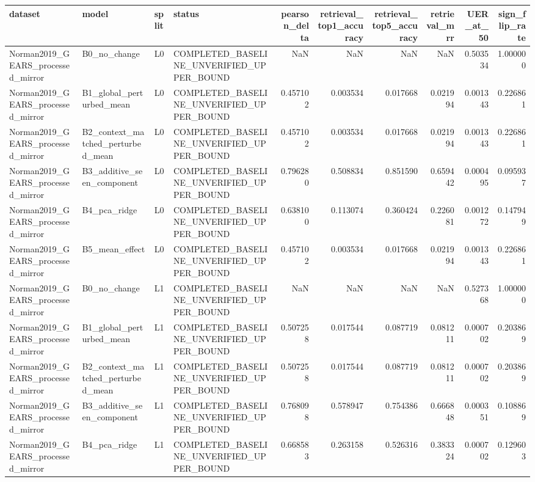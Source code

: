\begin{tabular}{llllrrrrrr}
\toprule
dataset & model & split & status & pearson_delta & retrieval_top1_accuracy & retrieval_top5_accuracy & retrieval_mrr & UER_at_50 & sign_flip_rate \\
\midrule
Norman2019_GEARS_processed_mirror & B0_no_change & L0 & COMPLETED_BASELINE_UNVERIFIED_UPPER_BOUND & NaN & NaN & NaN & NaN & 0.503534 & 1.000000 \\
Norman2019_GEARS_processed_mirror & B1_global_perturbed_mean & L0 & COMPLETED_BASELINE_UNVERIFIED_UPPER_BOUND & 0.457102 & 0.003534 & 0.017668 & 0.021994 & 0.001343 & 0.226861 \\
Norman2019_GEARS_processed_mirror & B2_context_matched_perturbed_mean & L0 & COMPLETED_BASELINE_UNVERIFIED_UPPER_BOUND & 0.457102 & 0.003534 & 0.017668 & 0.021994 & 0.001343 & 0.226861 \\
Norman2019_GEARS_processed_mirror & B3_additive_seen_component & L0 & COMPLETED_BASELINE_UNVERIFIED_UPPER_BOUND & 0.796280 & 0.508834 & 0.851590 & 0.659442 & 0.000495 & 0.095937 \\
Norman2019_GEARS_processed_mirror & B4_pca_ridge & L0 & COMPLETED_BASELINE_UNVERIFIED_UPPER_BOUND & 0.638100 & 0.113074 & 0.360424 & 0.226081 & 0.001272 & 0.147949 \\
Norman2019_GEARS_processed_mirror & B5_mean_effect & L0 & COMPLETED_BASELINE_UNVERIFIED_UPPER_BOUND & 0.457102 & 0.003534 & 0.017668 & 0.021994 & 0.001343 & 0.226861 \\
Norman2019_GEARS_processed_mirror & B0_no_change & L1 & COMPLETED_BASELINE_UNVERIFIED_UPPER_BOUND & NaN & NaN & NaN & NaN & 0.527368 & 1.000000 \\
Norman2019_GEARS_processed_mirror & B1_global_perturbed_mean & L1 & COMPLETED_BASELINE_UNVERIFIED_UPPER_BOUND & 0.507258 & 0.017544 & 0.087719 & 0.081211 & 0.000702 & 0.203869 \\
Norman2019_GEARS_processed_mirror & B2_context_matched_perturbed_mean & L1 & COMPLETED_BASELINE_UNVERIFIED_UPPER_BOUND & 0.507258 & 0.017544 & 0.087719 & 0.081211 & 0.000702 & 0.203869 \\
Norman2019_GEARS_processed_mirror & B3_additive_seen_component & L1 & COMPLETED_BASELINE_UNVERIFIED_UPPER_BOUND & 0.768098 & 0.578947 & 0.754386 & 0.666848 & 0.000351 & 0.108869 \\
Norman2019_GEARS_processed_mirror & B4_pca_ridge & L1 & COMPLETED_BASELINE_UNVERIFIED_UPPER_BOUND & 0.668583 & 0.263158 & 0.526316 & 0.383324 & 0.000702 & 0.129603 \\

\end{tabular}
